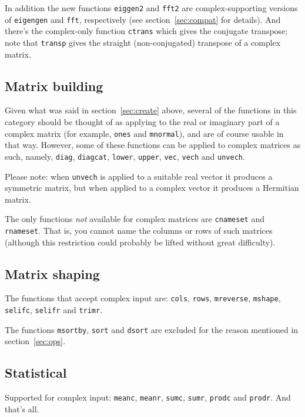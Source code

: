 \documentclass{article}
\begin{document}
In addition the new functions \texttt{eiggen2} and \texttt{fft2} are
complex-supporting versions of \texttt{eigengen} and \texttt{fft},
respectively (see section~\ref{sec:compat} for details). And there's
the complex-only function \texttt{ctrans} which gives the conjugate
transpose; note that \texttt{transp} gives the straight
(non-conjugated) transpose of a complex matrix.

\subsection{Matrix building}

Given what was said in section~\ref{sec:create} above, several of the
functions in this category should be thought of as applying to the
real or imaginary part of a complex matrix (for example, \texttt{ones}
and \texttt{mnormal}), and are of course usable in that way.  However,
some of these functions can be applied to complex matrices as such,
namely, \texttt{diag}, \texttt{diagcat}, \texttt{lower},
\texttt{upper}, \texttt{vec}, \texttt{vech} and \texttt{unvech}.

Please note: when \texttt{unvech} is applied to a suitable real
vector it produces a symmetric matrix, but when applied to a complex
vector it produces a Hermitian matrix.

The only functions \textit{not} available for complex matrices are
\texttt{cnameset} and \texttt{rnameset}. That is, you cannot name the
columns or rows of such matrices (although this restriction could
probably be lifted without great difficulty).

\subsection{Matrix shaping}

The functions that accept complex input are: \texttt{cols},
\texttt{rows}, \texttt{mreverse}, \texttt{mshape}, \texttt{selifc},
\texttt{selifr} and \texttt{trimr}.

The functions \texttt{msortby}, \texttt{sort} and \texttt{dsort} are
excluded for the reason mentioned in section~\ref{sec:ops}.

\subsection{Statistical}

Supported for complex input: \texttt{meanc}, \texttt{meanr},
\texttt{sumc}, \texttt{sumr}, \texttt{prodc} and \texttt{prodr}. And
that's all.
\end{document}
